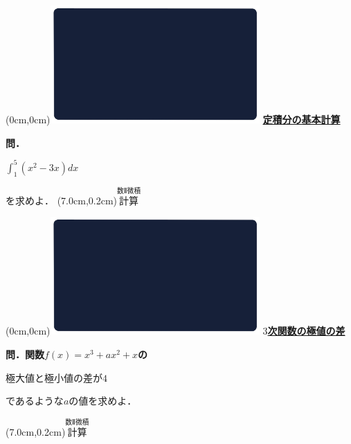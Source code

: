 \documentclass[10pt,
fleqn,
dvipdfmx,
uplatex
]{jsarticle}
\begin{document}
\at(0cm,0cm){\includegraphics[width=8cm,bb=0 0 1920 1080]{./thumbnails/templates/smart_background/数II微積.jpeg}}
{\color{orange}\bf\boldmath\LARGE\underline{定積分の基本計算}}\vspace{0.3zw}

\large 
\bf\boldmath 問．

\HUGE 
\vspace{-0.2zw}
\hspace{0.2zw}$\displaystyle\int_1^5\left(x^2-3x\right)dx$
\vspace{-1zw}

\large
\hfill を求めよ．
\at(7.0cm,0.2cm){\small\color{bradorange}$\overset{\text{数Ⅱ微積}}{\text{計算}}$}


\newpage



\at(0cm,0cm){\includegraphics[width=8cm,bb=0 0 1920 1080]{./thumbnails/templates/smart_background/数II微積.jpeg}}
{\color{orange}\bf\boldmath\LARGE\underline{$3$次関数の極値の差}}\vspace{0.5zw}

\large 
\bf\boldmath 問．関数$f\left(x\right)=x^3+ax^2+x$の

\huge
\vspace{0.5zw}
\hspace{0.1zw}極大値と極小値の差が$4$

\vspace{0.7zw}
\large 
\hfill であるような$a$の値を求めよ．




\at(7.0cm,0.2cm){\small\color{bradorange}$\overset{\text{数Ⅱ微積}}{\text{計算}}$}
\end{document}
